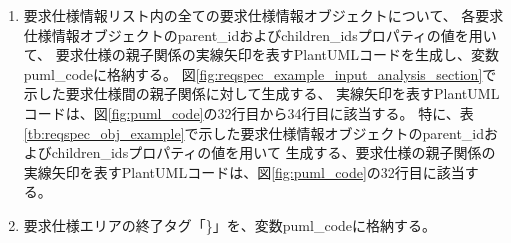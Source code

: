 \begin{enumerate}
\begin{enumerate}
\begin{enumerate}
\begin{itemize}
\begin{itemize}
                    対応関係情報オブジェクトの品質種別に基づき、背景色に、表\ref{tab:quality_type}に示した「FULL」に対応する緑色、または、「PARTIAL」に対応する黄色を設定する。
                \end{itemize}
            \end{itemize}
            \item 要求仕様情報オブジェクトのid、name、descriptionプロパティの値と、$3$.(b)ii.で設定した背景色を用いて、要求仕様の矩形要素を表すPlantUMLコードを生成し、変数puml\_codeに格納する。
            図\ref{fig:reqspec_example_input_analysis_section}で示した4件の要求仕様に対して生成する、要求仕様の矩形要素を表すPlantUMLコードは、
            図\ref{fig:puml_code}の28行目から31行目に該当する。
            特に、表\ref{tb:reqspec_obj_example}で示した要求仕様情報オブジェクトに対して生成する、要求仕様の矩形要素を表すPlantUMLコードは、
            図\ref{fig:puml_code}の29行目に該当する。
        \end{enumerate}
        \item 要求仕様情報リスト内の全ての要求仕様情報オブジェクトについて、
        各要求仕様情報オブジェクトのparent\_idおよびchildren\_idsプロパティの値を用いて、
        要求仕様の親子関係の実線矢印を表すPlantUMLコードを生成し、変数puml\_codeに格納する。
        図\ref{fig:reqspec_example_input_analysis_section}で示した要求仕様間の親子関係に対して生成する、
        実線矢印を表すPlantUMLコードは、図\ref{fig:puml_code}の32行目から34行目に該当する。
        特に、表\ref{tb:reqspec_obj_example}で示した要求仕様情報オブジェクトのparent\_idおよびchildren\_idsプロパティの値を用いて
        生成する、要求仕様の親子関係の実線矢印を表すPlantUMLコードは、図\ref{fig:puml_code}の32行目に該当する。
        \item 要求仕様エリアの終了タグ「\}」を、変数puml\_codeに格納する。
    \end{enumerate}


\end{enumerate}
